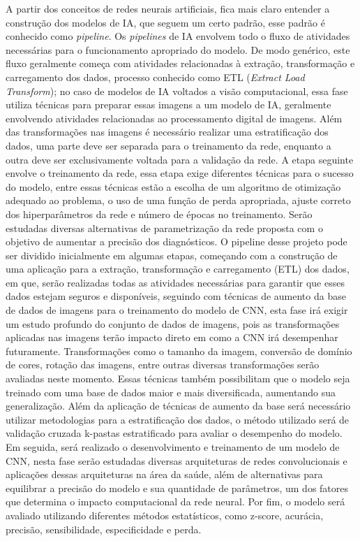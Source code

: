 A partir dos conceitos de redes neurais artificiais, fica mais claro entender a construção dos modelos de IA, que seguem um certo padrão, esse padrão é conhecido como \textit{pipeline}. Os \textit{pipelines} de IA envolvem todo o fluxo de atividades necessárias para o funcionamento apropriado do modelo. De modo genérico, este fluxo geralmente começa com atividades relacionadas à extração, transformação e carregamento dos dados, processo conhecido como ETL (\textit{Extract Load Transform}); no caso de modelos de IA voltados a visão computacional, essa fase utiliza técnicas para preparar essas imagens a um modelo de IA, geralmente envolvendo atividades relacionadas ao processamento digital de imagens. Além das transformações nas imagens é necessário realizar uma estratificação dos dados, uma parte deve ser separada para o treinamento da rede, enquanto a outra deve ser exclusivamente voltada para a validação da rede. A etapa seguinte envolve o treinamento da rede, essa etapa exige diferentes técnicas para o sucesso do modelo, entre essas técnicas estão a escolha de um algoritmo de otimização adequado ao problema, o uso de uma função de perda apropriada, ajuste correto dos hiperparâmetros da rede e número de épocas no treinamento.
Serão estudadas diversas alternativas de parametrização da rede proposta com o objetivo de aumentar a precisão dos diagnósticos. O pipeline desse projeto pode ser dividido inicialmente em algumas etapas, começando com a construção de uma aplicação para a extração, transformação e carregamento (ETL) dos dados, em que, serão realizadas todas as atividades necessárias para garantir que esses dados estejam seguros e disponíveis, seguindo com técnicas de aumento da base de dados de imagens para o treinamento do modelo de CNN, esta fase irá exigir um estudo profundo do conjunto de dados de imagens, pois as transformações aplicadas nas imagens terão impacto direto em como a CNN irá desempenhar futuramente. Transformações como o tamanho da imagem, conversão de domínio de cores, rotação das imagens, entre outras diversas transformações serão avaliadas neste momento. Essas técnicas também possibilitam que o modelo seja treinado com uma base de dados maior e mais diversificada, aumentando sua generalização. Além da aplicação de técnicas de aumento da base será necessário utilizar metodologias para a estratificação dos dados, o método utilizado será de validação cruzada k-pastas estratificado para avaliar o desempenho do modelo. Em seguida, será realizado o desenvolvimento e treinamento de um modelo de CNN, nesta fase serão estudadas diversas arquiteturas de redes convolucionais e aplicações dessas arquiteturas na área da saúde, além de alternativas para equilibrar a precisão do modelo e sua quantidade de parâmetros, um dos fatores que determina o impacto computacional da rede neural. Por fim, o modelo será avaliado utilizando diferentes métodos estatísticos, como z-score, acurácia, precisão, sensibilidade, especificidade e perda.
